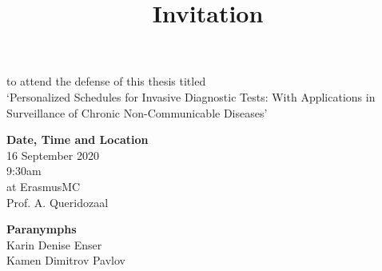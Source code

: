 \documentclass[12pt]{article}
\title{\normalsize{\textbf{Invitation}}}
\date{}
\begin{document}
\maketitle
\vspace{-40mm}

\begin{center}
\footnotesize{to attend the defense of this thesis titled}\\
\vspace{1mm}
\footnotesize{`Personalized Schedules for Invasive Diagnostic Tests: With Applications in Surveillance of Chronic Non-Communicable Diseases'}\\
\vspace{40mm}

\normalsize{\textbf{Date, Time and Location}}\\
\vspace{2mm}
\footnotesize{16 September 2020\\9:30am\\at ErasmusMC\\Prof. A. Queridozaal}
\vspace{40mm}

\normalsize{\textbf{Paranymphs}}\\
\vspace{2mm}
\footnotesize{Karin Denise Enser}\\
\footnotesize{Kamen Dimitrov Pavlov}\\

\end{center}
\end{document}
